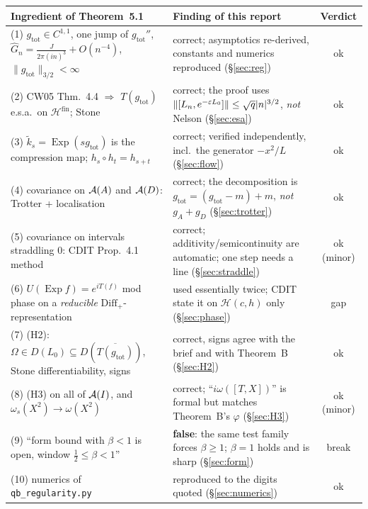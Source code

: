 \documentclass[11pt]{article}
\newcommand{\Om}{\Omega}
\newcommand{\Hil}{\mathcal H}
\newcommand{\Hfin}{\Hil^{\mathrm{fin}}}
\newcommand{\Diff}{\mathrm{Diff}_+}
\newcommand{\nrm}[1]{\lVert #1\rVert}
\newcommand{\abz}[1]{\lvert #1\rvert}
\newcommand{\gtot}{g_{\mathrm{tot}}}
\newcommand{\ktil}{\widetilde k}
\newcommand{\Exp}{\operatorname{Exp}}
\begin{document}
\begin{center}\small
\begin{tabularx}{\textwidth}{>{\raggedright\arraybackslash}p{} >{\raggedright\arraybackslash}X c}\toprule
Ingredient of Theorem~5.1 & Finding of this report & Verdict\\\midrule
(1) $\gtot\in C^{1,1}$, one jump of $\gtot''$, $\hat G_n=\frac J{2\pi(in)^3}+O(n^{-4})$, $\nrm\gtot_{3/2}<\infty$
 & correct; asymptotics re-derived, constants and numerics reproduced (\S\ref{sec:reg}) & ok\\
(2) CW05 Thm.~4.4 $\Rightarrow$ $T(\gtot)$ e.s.a.\ on $\Hfin$; Stone
 & correct; the proof uses $\nrm{[L_n,e^{-\eps L_0}]}\le\sqrt q\abz n^{3/2}$, \emph{not} Nelson (\S\ref{sec:esa})
 & ok\\
(3) $\ktil_s=\Exp(s\gtot)$ is the compression map; $h_s\circ h_t=h_{s+t}$
 & correct; verified independently, incl.\ the generator $-x^2/L$ (\S\ref{sec:flow}) & ok\\
(4) covariance on $\mathcal A(A)$ and $\mathcal A(D)$: Trotter + localisation
 & correct; the decomposition is $\gtot=(\gtot-m)+m$, \emph{not} $g_A+g_D$ (\S\ref{sec:trotter}) & ok\\
(5) covariance on intervals straddling $0$: CDIT Prop.~4.1 method
 & correct; additivity/semicontinuity are automatic; one step needs a line (\S\ref{sec:straddle}) & ok (minor)\\
(6) $U(\Exp f)=e^{iT(f)}$ mod phase on a \emph{reducible} $\Diff$-representation
 & used essentially twice; CDIT state it on $\Hil(c,h)$ only (\S\ref{sec:phase}) & gap\\
(7) (H2): $\Om\in D(L_0)\subseteq D(\overline{T(\gtot)})$, Stone differentiability, signs
 & correct, signs agree with the brief and with Theorem~B (\S\ref{sec:H2}) & ok\\
(8) (H3) on all of $\mathcal A(I)$, and $\omega_s(X^2)\to\omega(X^2)$
 & correct; ``$i\omega([T,X])$'' is formal but matches Theorem~B's $\varphi$ (\S\ref{sec:H3}) & ok (minor)\\
(9) ``form bound with $\beta<1$ is open, window $\tfrac12\le\beta<1$''
 & \textbf{false}: the same test family forces $\beta\ge1$; $\beta=1$ holds and is sharp (\S\ref{sec:form})
 & break\\
(10) numerics of \texttt{qb\_regularity.py}
 & reproduced to the digits quoted (\S\ref{sec:numerics}) & ok\\
\bottomrule
\end{tabularx}
\end{center}
\end{document}
